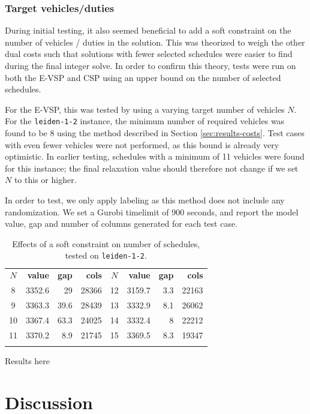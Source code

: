 \documentclass[]{article}
\begin{document}
\subsubsection{Target vehicles/duties}
During initial testing, it also seemed beneficial to add a soft constraint on the number of vehicles / duties in the solution. This was theorized to weigh the other dual costs such that solutions with fewer selected schedules were easier to find during the final integer solve. In order to confirm this theory, tests were run on both the E-VSP and CSP using an upper bound on the number of selected schedules.

For the E-VSP, this was tested by using a varying target number of vehicles $N$. For the \texttt{leiden-1-2} instance, the minimum number of required vehicles was found to be 8 using the method described in Section \ref{sec:results-costs}. Test cases with even fewer vehicles were not performed, as this bound is already very optimistic. In earlier testing, schedules with a minimum of 11 vehicles were found for this instance; the final relaxation value should therefore not change if we set $N$ to this or higher. 

In order to test, we only apply labeling as this method does not include any randomization. We set a Gurobi timelimit of 900 seconds, and report the model value, gap and number of columns generated for each test case.

\begin{table}[h]
  \centering
  \begin{tabular}{crrrcrrr}
    \toprule
    $N$ & \textbf{value} & \textbf{gap} & \textbf{cols} & $N$ & \textbf{value} & \textbf{gap} & \textbf{cols}\\
    \cmidrule(lr){1-4}\cmidrule(lr){5-8}
    8   & 3352.6 & 29   & 28366 & 12 & 3159.7 & 3.3  & 22163 \\
    9   & 3363.3 & 39.6 & 28439 & 13 & 3332.9 & 8.1  & 26062 \\
    10  & 3367.4 & 63.3 & 24025 & 14 & 3332.4 & 8    & 22212 \\
    11  & 3370.2 & 8.9  & 21745 & 15 & 3369.5 & 8.3  & 19347 \\
    \arrayrulecolor{black}\bottomrule
  \end{tabular}
  \caption{Effects of a soft constraint on number of schedules, tested on \texttt{leiden-1-2}.}
  \label{tab:evsp-schedule-cap}
\end{table}

Results here 

\section{Discussion}
\end{document}
